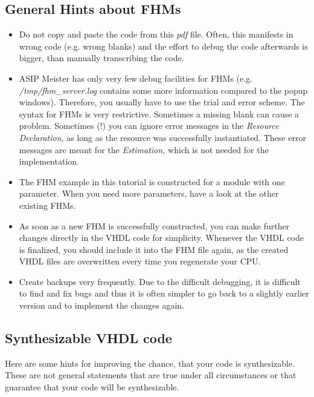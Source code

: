 \documentclass[
]{article}
\begin{document}
\hypertarget{general-hints-about-fhms}{%
\subsection{General Hints about FHMs}\label{general-hints-about-fhms}}

\begin{itemize}
\item
  Do not copy and paste the code from this \emph{pdf} file. Often, this
  manifests in wrong code (e.g. wrong blanks) and the effort to debug
  the code afterwards is bigger, than manually transcribing the code.
\item
  ASIP Meister has only very few debug facilities for FHMs (e.g.
  \emph{/tmp/fhm\_server.log} contains some more information compared to
  the popup windows). Therefore, you usually have to use the trial and
  error scheme. The syntax for FHMs is very restrictive. Sometimes a
  missing blank can cause a problem. Sometimes (!) you can ignore error
  messages in the \emph{Resource Declaration}, as long as the resource
  was successfully instantiated. These error messages are meant for the
  \emph{Estimation,} which is not needed for the implementation.
\item
  The FHM example in this tutorial is constructed for a module with one
  parameter. When you need more parameters, have a look at the other
  existing FHMs.
\item
  As soon as a new FHM is successfully constructed, you can make further
  changes directly in the VHDL code for simplicity. Whenever the VHDL
  code is finalized, you should include it into the FHM file again, as
  the created VHDL files are overwritten every time you regenerate your
  CPU.
\item
  Create backups very frequently. Due to the difficult debugging, it is
  difficult to find and fix bugs and thus it is often simpler to go back
  to a slightly earlier version and to implement the changes again.
\end{itemize}

\hypertarget{synthesizable-vhdl-code}{%
\subsection{Synthesizable VHDL code}\label{synthesizable-vhdl-code}}

Here are some hints for improving the chance, that your code is
synthesizable. These are not general statements that are true under all
circumstances or that guarantee that your code will be synthesizable.
\end{document}
